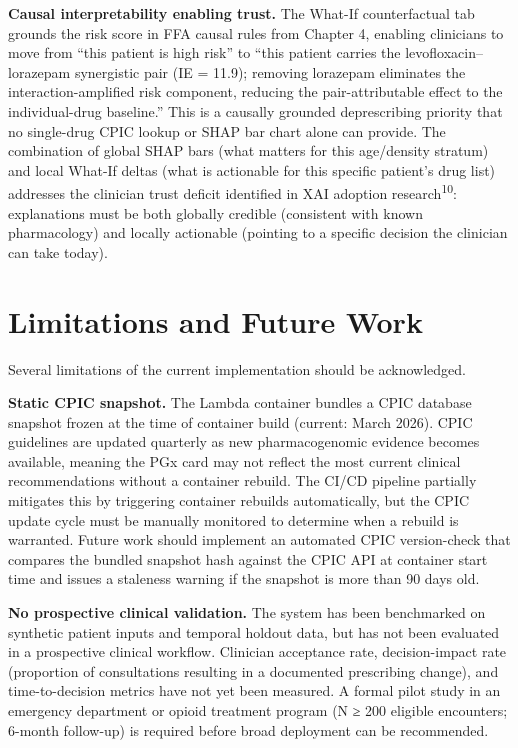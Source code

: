 \documentclass[
  12pt,
]{book}
\begin{document}
\textbf{Causal interpretability enabling trust.} The What-If
counterfactual tab grounds the risk score in FFA causal rules from
Chapter 4, enabling clinicians to move from ``this patient is high
risk'' to ``this patient carries the levofloxacin--lorazepam synergistic
pair (IE = 11.9); removing lorazepam eliminates the
interaction-amplified risk component, reducing the pair-attributable
effect to the individual-drug baseline.'' This is a causally grounded
deprescribing priority that no single-drug CPIC lookup or SHAP bar chart
alone can provide. The combination of global SHAP bars (what matters for
this age/density stratum) and local What-If deltas (what is actionable
for this specific patient's drug list) addresses the clinician trust
deficit identified in XAI adoption research\textsuperscript{10}:
explanations must be both globally credible (consistent with known
pharmacology) and locally actionable (pointing to a specific decision
the clinician can take today).

\section{Limitations and Future Work}\label{limitations-and-future-work}

Several limitations of the current implementation should be
acknowledged.

\textbf{Static CPIC snapshot.} The Lambda container bundles a CPIC
database snapshot frozen at the time of container build (current: March
2026). CPIC guidelines are updated quarterly as new pharmacogenomic
evidence becomes available, meaning the PGx card may not reflect the
most current clinical recommendations without a container rebuild. The
CI/CD pipeline partially mitigates this by triggering container rebuilds
automatically, but the CPIC update cycle must be manually monitored to
determine when a rebuild is warranted. Future work should implement an
automated CPIC version-check that compares the bundled snapshot hash
against the CPIC API at container start time and issues a staleness
warning if the snapshot is more than 90 days old.

\textbf{No prospective clinical validation.} The system has been
benchmarked on synthetic patient inputs and temporal holdout data, but
has not been evaluated in a prospective clinical workflow. Clinician
acceptance rate, decision-impact rate (proportion of consultations
resulting in a documented prescribing change), and time-to-decision
metrics have not yet been measured. A formal pilot study in an emergency
department or opioid treatment program (N ≥ 200 eligible encounters;
6-month follow-up) is required before broad deployment can be
recommended.
\end{document}
